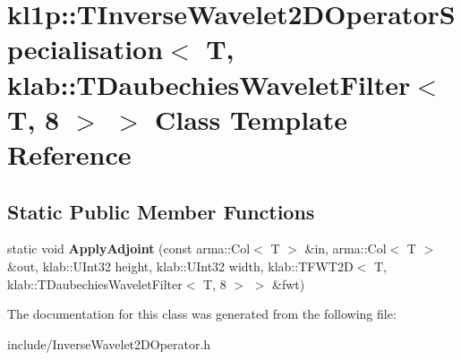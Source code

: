 \hypertarget{classkl1p_1_1TInverseWavelet2DOperatorSpecialisation_3_01T_00_01klab_1_1TDaubechiesWaveletFilter_3_01T_00_018_01_4_01_4}{}\section{kl1p\+:\+:T\+Inverse\+Wavelet2\+D\+Operator\+Specialisation$<$ T, klab\+:\+:T\+Daubechies\+Wavelet\+Filter$<$ T, 8 $>$ $>$ Class Template Reference}
\label{classkl1p_1_1TInverseWavelet2DOperatorSpecialisation_3_01T_00_01klab_1_1TDaubechiesWaveletFilter_3_01T_00_018_01_4_01_4}
\subsection*{Static Public Member Functions}
\begin{DoxyCompactItemize}
\item 
static void {\bfseries Apply\+Adjoint} (const arma\+::\+Col$<$ T $>$ \&in, arma\+::\+Col$<$ T $>$ \&out, klab\+::\+U\+Int32 height, klab\+::\+U\+Int32 width, klab\+::\+T\+F\+W\+T2D$<$ T, klab\+::\+T\+Daubechies\+Wavelet\+Filter$<$ T, 8 $>$ $>$ \&fwt)\hypertarget{classkl1p_1_1TInverseWavelet2DOperatorSpecialisation_3_01T_00_01klab_1_1TDaubechiesWaveletFilter_3_01T_00_018_01_4_01_4_a4f3368c876c5108e263d62fcc8d9c7bc}{}\label{classkl1p_1_1TInverseWavelet2DOperatorSpecialisation_3_01T_00_01klab_1_1TDaubechiesWaveletFilter_3_01T_00_018_01_4_01_4_a4f3368c876c5108e263d62fcc8d9c7bc}

\end{DoxyCompactItemize}


The documentation for this class was generated from the following file\+:\begin{DoxyCompactItemize}
\item 
include/Inverse\+Wavelet2\+D\+Operator.\+h\end{DoxyCompactItemize}
